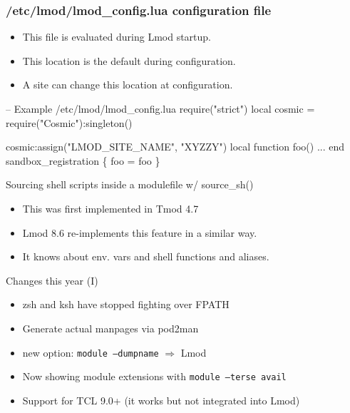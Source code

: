 \documentclass{beamer}
\begin{document}
\begin{frame}[fragile]
  \frametitle{/etc/lmod/lmod\_config.lua configuration file}
  \begin{itemize}
    \item This file is evaluated during Lmod startup. 
    \item This location is the default during configuration.
    \item A site can change this location at configuration.
  \end{itemize}
    {\small
\begin{semiverbatim}
-- Example /etc/lmod/lmod\_config.lua
require("strict")
local cosmic = require("Cosmic"):singleton()

cosmic:assign("LMOD\_SITE\_NAME", "XYZZY")
local function foo()
  ...
end
sandbox\_registration \{ foo = foo \}
\end{semiverbatim}
}
\end{frame}

\begin{frame}{Sourcing shell scripts inside a modulefile w/ source\_sh()}
  \begin{itemize}
    \item This was first implemented in Tmod 4.7
    \item Lmod 8.6 re-implements this feature in a similar way.
    \item It knows about env. vars and shell functions and aliases.
  \end{itemize}
\end{frame}

\begin{frame}{Changes this year (I)}
  \begin{itemize}
    \item zsh and ksh have stopped fighting over FPATH
    \item Generate actual manpages via pod2man
    \item new option: \texttt{module --dumpname} $\Rightarrow$ Lmod
    \item Now showing module extensions with \texttt{module --terse  avail}
    \item Support for TCL 9.0+ (it works but not integrated into Lmod)
  \end{itemize}
\end{frame}
\end{document}
